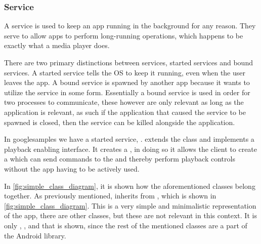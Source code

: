 \subsubsection{Service}\label{subsec:services}
A service is used to keep an app running in the background for any reason.
They serve to allow apps to perform long-running operations, which happens to be exactly what a media player does.

There are two primary distinctions between services, started services and bound services.
A started service tells the OS to keep it running, even when the user leaves the app.
A bound service is spawned by another app because it wants to utilize the service in some form.
Essentially a bound service is used in order for two processes to communicate, these however are only relevant as long as the application is relevant, as such if the application that caused the service to be spawned is closed, then the service can be killed alongside the application.\cite{androidFundamentals}

In googlesamples we have a started service, .
\sloppy{} extends the  class and implements a playback enabling interface.
It creates a , in doing so it allows the client to create a  which can send commands to the  and thereby perform playback controls without the app having to be actively used.

In \cref{fig:simple_class_diagram}, it is shown how the aforementioned classes belong together.
As previously mentioned,  inherits from , which is shown in \cref{fig:simple_class_diagram}.
This is a very simple and minimalistic representation of the app, there are other classes, but these are not relevant in this context.
It is only , , and  that is shown, since the rest of the mentioned classes are a part of the Android library.


